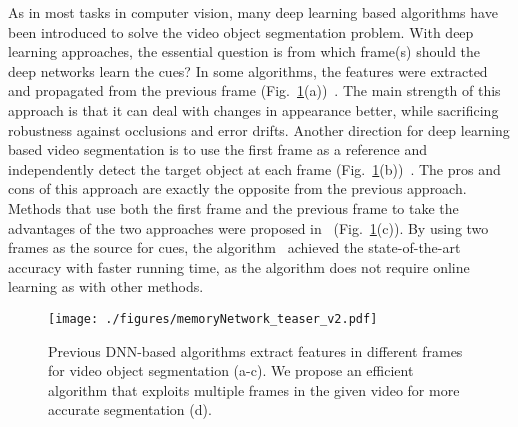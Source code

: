 \documentclass[10pt,twocolumn,letterpaper]{article}
\newcommand{\fref}[1]{Fig.~\ref{#1}}
\begin{document}
As in most tasks in computer vision, many deep learning based algorithms have been introduced to solve the video object segmentation problem. 
With deep learning approaches, the essential question is from which frame(s) should the deep networks learn the cues?
In some algorithms, the features were extracted and propagated from the previous frame (\fref{Fig:teaser}(a))~\cite{hu2017maskrnn, perazzi2017learning}.
The main strength of this approach is that it can deal with changes in appearance better, while sacrificing robustness against occlusions and error drifts. 
Another direction for deep learning based video segmentation is to use the first frame as a reference and independently detect the target object at each frame (\fref{Fig:teaser}(b))~\cite{caelles2017one, yoon2017pixel, hu2018videomatch}. The pros and cons of this approach are exactly the opposite from the previous approach. 
Methods that use both the first frame and the previous frame to take the advantages of the two approaches were proposed in~\cite{oh2018fast,yang2018efficient} (\fref{Fig:teaser}(c)). By using two frames as the source for cues, the algorithm~\cite{oh2018fast} achieved the state-of-the-art accuracy with faster running time, as the algorithm does not require online learning as with other methods. 

\begin{figure}
\centering
\texttt{[image: ./figures/memoryNetwork\_teaser\_v2.pdf]}
\caption{
Previous DNN-based algorithms extract features in different frames for video object segmentation (a-c). We propose an efficient algorithm that exploits multiple frames in the given video for more accurate segmentation (d).
}
\label{Fig:teaser}
\end{figure}
\end{document}
